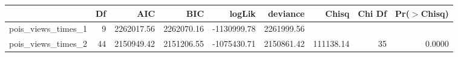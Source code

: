 \begin{table}[ht]
\centering
\begin{tabular}{lrrrrrrrr}
  \hline
 & Df & AIC & BIC & logLik & deviance & Chisq & Chi Df & Pr($>$Chisq) \\ 
  \hline
pois\_views\_times\_1 & 9 & 2262017.56 & 2262070.16 & -1130999.78 & 2261999.56 &  &  &  \\ 
  pois\_views\_times\_2 & 44 & 2150949.42 & 2151206.55 & -1075430.71 & 2150861.42 & 111138.14 & 35 & 0.0000 \\ 
   \hline
\end{tabular}
\end{table}
